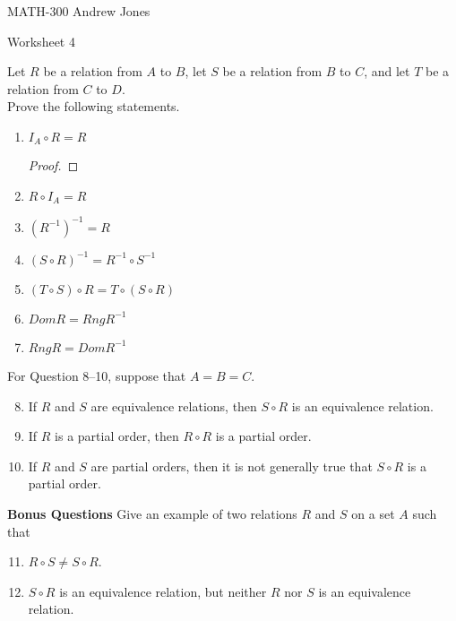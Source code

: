 \documentclass{article}
\begin{document}
    MATH-300 \hfill Andrew Jones
  \begin{center}
  {\huge Worksheet 4}
  \end{center}
  Let $R$ be a relation from $A$ to $B$, let $S$ be a relation from $B$ to $C$, and let $T$ be a relation from $C$ to $D$. \\ Prove the following statements. \\
  \begin{enumerate}
    \item $I_A \circ R = R$
      \begin{proof}
        
      \end{proof}
    \item $R \circ I_A = R$
    \item $(R^{-1})^{-1} = R$
    \item $(S \circ R)^{-1} = R^{-1}\circ S^{-1}$
    \item $(T \circ S) \circ R = T \circ (S \circ R)$
    \item $Dom R = Rng R^{-1}$
    \item $Rng R = Dom R^{-1}$
  \end{enumerate}
  For Question 8–10, suppose that $A = B = C$.
  \begin{enumerate} \setcounter{enumi}{7}
    \item If $R$ and $S$ are equivalence relations, then $S \circ R$ is an equivalence relation.
    \item If $R$ is a partial order, then $R \circ R$ is a partial order.
    \item If $R$ and $S$ are partial orders, then it is not generally true that $S \circ R$ is a partial order.
  \end{enumerate}
  \textbf{Bonus Questions}
  Give an example of two relations $R$ and $S$ on a set $A$ such that \\
  \begin{enumerate} \setcounter{enumi}{10}
    \item $R \circ S \neq S \circ R$.
    \item $S \circ R$ is an equivalence relation, but neither $R$ nor $S$ is an equivalence relation.
   \end{enumerate}
\end{document}
